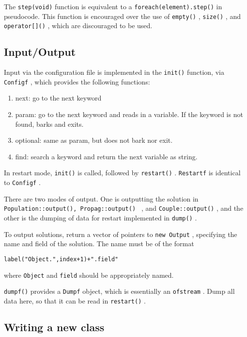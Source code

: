 \documentclass[12pt,a4paper]{article}
\newcommand{\type}[1]{ {\small\small\tt #1} }
\begin{document}
The \type{step(void)} function is equivalent to a \type{foreach(element).step()} in pseudocode. This function is encouraged over the use of \type{empty()}, \type{size()}, and \type{operator[]()}, which are discouraged to be used.

\subsection{Input/Output}

Input via the configuration file is implemented in the \type{init()} function, via \type{Configf}, which provides the following functions:
	\begin{enumerate}
	\item next: go to the next keyword
	\item param: go to the next keyword and reads in a variable. If the keyword is not found, barks and exits.
	\item optional: same as param, but does not bark nor exit.
	\item find: search a keyword and return the next variable as string.
	\end{enumerate}

In restart mode, \type{init()} is called, followed by \type{restart()}. \type{Restartf} is identical to \type{Configf}.

There are two modes of output. One is outputting the solution in \type{Population::output(), \type{Propag::output()}}, and \type{Couple::output()}, and the other is the dumping of data for restart implemented in \type{dump()}.

To output solutions, return a vector of pointers to \type{new Output}, specifying the name and field of the solution. The name must be of the format
\begin{lstlisting}
label("Object.",index+1)+".field"
\end{lstlisting}
where \type{Object} and \type{field} should be appropriately named.

\type{dumpf()} provides a \type{Dumpf} object, which is essentially an \type{ofstream}. Dump all data here, so that it can be read in \type{restart()}.

\subsection{Writing a new class}
\end{document}
